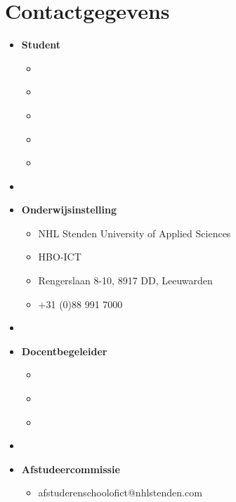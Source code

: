 \thispagestyle{empty}

\section*{Contactgegevens}

\begin{itemize}
	\item[]\textbf{Student}\ 
	\begin{itemize}
		\item[]{ \StudentName}
		\item[]{ \StudentNumber}
		\item[]{ \AcedemicYear}
		\item[]{ \StudentEmail}
		\item[]{ \StudentPhone}
	\end{itemize}

	\item[]
	
	\item[]\textbf{Onderwijsinstelling}\ 
	\begin{itemize}
		\item[]{ NHL Stenden University of Applied Sciences}
		\item[]{ HBO-ICT}
		\item[]{\makebox[5cm][l]{Locatie} Rengerslaan 8-10, 8917 DD, Leeuwarden}
		\item[]{ +31 (0)88 991 7000}
	\end{itemize}

	\item[]
	
	\item[]\textbf{Docentbegeleider}\ 
	\begin{itemize}
		\item[]{ \LecturerName}
		\item[]{ \LecturerEmail}
		\item[]{ \LecturePhone}
	\end{itemize}

	\item[]

	\item[]\textbf{Afstudeercommissie}\ 
	\begin{itemize}
		\item[]{ afstuderenschoolofict@nhlstenden.com}
	\end{itemize}
	

\end{itemize}
